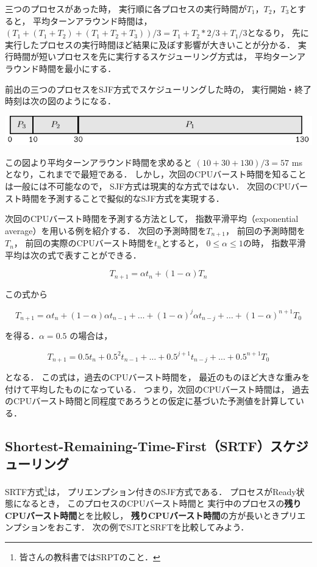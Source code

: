 三つのプロセスがあった時，
実行順に各プロセスの実行時間が$T_1$，$T_2$，$T_3$とすると，
平均ターンアラウンド時間は，
$(T_1+(T_1+T_2)+(T_1+T_2+T_3))/3=T_1+T_2*2/3+T_1/3$となるり，
先に実行したプロセスの実行時間ほど結果に及ぼす影響が大きいことが分かる．
実行時間が短いプロセスを先に実行するスケジューリング方式は，
平均ターンアラウンド時間を最小にする．

前出の三つのプロセスをSJF方式でスケジューリングした時の，
実行開始・終了時刻は次の図のようになる．

\begin{center}
\includegraphics[scale=1.0]{GanntChart/sjf1.pdf}
\end{center}

この図より平均ターンアラウンド時間を求めると
$(10+30+130)/3 = 57$ ms となり，これまでで最短である．
しかし，次回のCPUバースト時間を知ることは一般には不可能なので，
SJF方式は現実的な方式ではない．
次回のCPUバースト時間を予測することで擬似的なSJF方式を実現する．

次回のCPUバースト時間を予測する方法として，
指数平滑平均（exponential average）を用いる例を紹介する．
次回の予測時間を$T_{n+1}$，
前回の予測時間を$T_{n}$，
前回の実際のCPUバースト時間を$t_{n}$とすると，
$0 \le \alpha \le 1$の時，
指数平滑平均は次の式で表すことができる．

\[T_{n+1} = \alpha t_n + ( 1 - \alpha ) T_n\]

この式から

\[T_{n+1} = \alpha t_n + ( 1 - \alpha ) \alpha t_{n-1} + \dots +
 ( 1 - \alpha )^j \alpha t_{n-j} + \dots + (1 - \alpha )^{n+1} T_0 \]

を得る．$\alpha = 0.5$ の場合は，

\[T_{n+1} = 0.5 t_n + 0.5^2 t_{n-1} + \dots +
0.5^{j+1} t_{n-j} + \dots + 0.5^{n+1} T_0 \]

となる．
この式は，過去のCPUバースト時間を，
最近のものほど大きな重みを付けて平均したものになっている．
つまり，次回のCPUバースト時間は，
過去のCPUバースト時間と同程度であろうとの仮定に基づいた予測値を計算している．

\subsection{Shortest-Remaining-Time-First（SRTF）スケジューリング}
SRTF方式\footnote{皆さんの教科書ではSRPTのこと．}は，
プリエンプション付きのSJF方式である．
プロセスがReady状態になるとき，
このプロセスのCPUバースト時間と
実行中のプロセスの{\bf 残りCPUバースト時間}とを比較し，
{\bf 残りCPUバースト時間}の方が長いときプリエンプションをおこす．
次の例でSJTとSRFTを比較してみよう．

